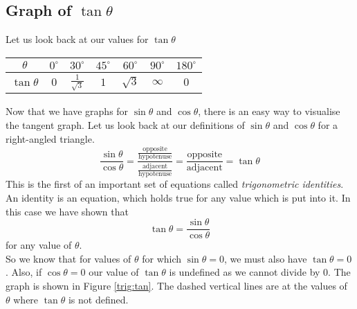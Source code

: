 \documentclass[10pt,a4paper,titlepage,twoside,openright]{report}
\begin{document}
\subsection{Graph of $\tan \theta$}


Let us look back at our values for $\tan{\theta}$ 

\begin{center}
\begin{tabular}{|c||c|c|c|c|c|c|}\hline
$\theta$ &$0^\circ$ & $30^\circ$ & $45^\circ$ & $60^\circ$ & $90^\circ$ & $180^\circ$\\\hline
\hline
$\tan{\theta}$ & $0$ & $\frac{1}{\sqrt{3}}$ & $1$ & $\sqrt{3}$ & $\infty$ & $0$ \\\hline
\end{tabular}
\end{center}

Now that we have graphs for $\sin \theta$ and $\cos \theta$, there is an easy way to visualise the tangent graph. Let us look back at our definitions of $\sin{\theta}$ and $\cos{\theta}$ for a right-angled triangle.
\[\frac{\sin{\theta}}{\cos{\theta}}=\frac{\frac{\mathrm{opposite}}{\mathrm{hypotenuse}}}{\frac{\mathrm{adjacent}}{\mathrm{hypotenuse}}}=\frac{\mathrm{opposite}}{\mathrm{adjacent}}=\tan{\theta}\]
This is the first of an important set of equations called \emph{trigonometric identities}. An identity is an equation, which holds true for any value which is put into it. In this case we have shown that
\[\tan{\theta}=\frac{\sin{\theta}}{\cos{\theta}}\]
for any value of $\theta$.\\
So we know that for values of $\theta$ for which $\sin{\theta}=0$, we must also have $\tan{\theta}=0$. Also, if $\cos{\theta}=0$ our value of $\tan{\theta}$ is undefined as we cannot divide by 0. The graph is shown in Figure \ref{trig:tan}. The dashed vertical lines are at the values of $\theta$ where $\tan \theta$ is not defined. 
\end{document}
